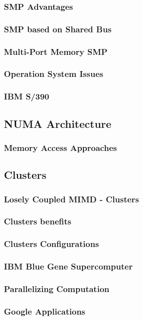 \subsubsection{SMP Advantages}
\subsubsection{SMP based on Shared Bus}
\subsubsection{Multi-Port Memory SMP}
\subsubsection{Operation System Issues}
\subsubsection{IBM S/390}
\subsection{NUMA Architecture}
\subsubsection{Memory Access Approaches}
\subsection{Clusters}
\subsubsection{Losely Coupled MIMD - Clusters}
\subsubsection{Clusters benefits}
\subsubsection{Clusters Configurations}
\subsubsection{IBM Blue Gene Supercomputer}
\subsubsection{Parallelizing Computation}
\subsubsection{Google Applications}
